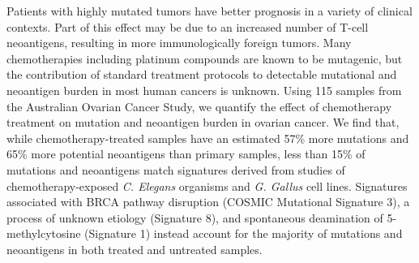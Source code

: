 Patients with highly mutated tumors have better prognosis in a variety of clinical contexts. Part of this effect may be due to an increased number of T-cell neoantigens, resulting in more immunologically foreign tumors. Many chemotherapies including platinum compounds are known to be mutagenic, but the contribution of standard treatment protocols to detectable mutational and neoantigen burden in most human cancers is unknown. Using 115 samples from the Australian Ovarian Cancer Study, we quantify the effect of chemotherapy treatment on mutation and neoantigen burden in ovarian cancer. We find that, while chemotherapy-treated samples have an estimated 57\% more mutations and 65\% more potential neoantigens than primary samples, less than 15\% of mutations and neoantigens match signatures derived from studies of chemotherapy-exposed \textit{C. Elegans} organisms and \textit{G. Gallus} cell lines. Signatures associated with BRCA pathway disruption (COSMIC Mutational Signature 3), a process of unknown etiology (Signature 8), and spontaneous deamination of 5-methylcytosine (Signature 1) instead account for the majority of mutations and neoantigens in both treated and untreated samples.


